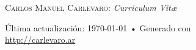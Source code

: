 \documentclass[10pt, a4paper]{article}
\begin{document}
% 
\thispagestyle{empty}
{\Large \textsc{Carlos Manuel Carlevaro}: \textit{Curriculum Vit{\ae}}}

\hrulefill













% 

\vspace{1cm}
\vfill{}
\begin{center}
{\scriptsize  Última actualización: \today\- •\- 
Generado con \href{http://es.wikipedia.org/wiki/XeTeX}{
\XeLaTeX}\\
\href{http://carlevaro.ar}{http://carlevaro.ar}}
\end{center}
\end{document}
